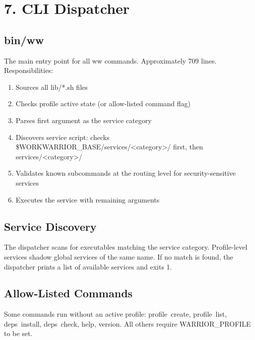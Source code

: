 \documentclass[11pt, a4paper, DIV=14]{scrartcl}
\renewcommand{\texttt}[1]{{\ttfamily\fontsize{8.5}{10.5}\selectfont\color{BabbNavy}#1}}
\providecommand{\tightlist}{\setlength{\itemsep}{2pt}\setlength{\parskip}{0pt}}
\begin{document}
\section{7. CLI Dispatcher}\label{cli-dispatcher}

\subsection{bin/ww}\label{binww}

The main entry point for all \texttt{ww} commands. Approximately 709
lines. Responsibilities:

\begin{enumerate}
\def\labelenumi{\arabic{enumi}.}
\tightlist
\item
  Sources all \texttt{lib/*.sh} files
\item
  Checks profile active state (or allow-listed command flag)
\item
  Parses first argument as the service category
\item
  Discovers service script: checks
  \texttt{\$WORKWARRIOR\_BASE/services/\textless{}category\textgreater{}/}
  first, then \texttt{services/\textless{}category\textgreater{}/}
\item
  Validates known subcommands at the routing level for
  security-sensitive services
\item
  Executes the service with remaining arguments
\end{enumerate}

\subsection{Service Discovery}\label{service-discovery}

The dispatcher scans for executables matching the service category.
Profile-level services shadow global services of the same name. If no
match is found, the dispatcher prints a list of available services and
exits 1.

\subsection{Allow-Listed Commands}\label{allow-listed-commands}

Some commands run without an active profile: \texttt{profile\ create},
\texttt{profile\ list}, \texttt{deps\ install}, \texttt{deps\ check},
\texttt{help}, \texttt{version}. All others require
\texttt{WARRIOR\_PROFILE} to be set.
\end{document}
